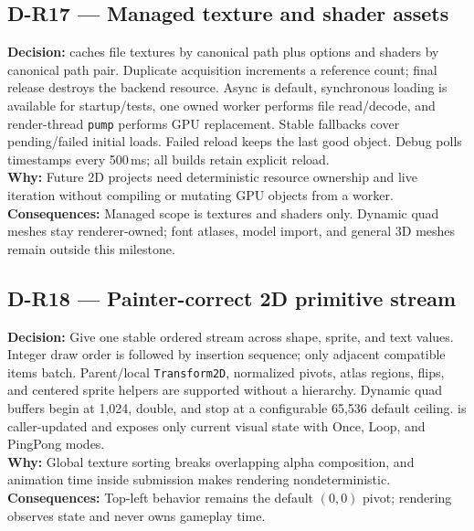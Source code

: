 \subsection*{D-R17 --- Managed texture and shader assets}
\begin{decisionbox}[title={D-R17 \quad 2026-08-09}]
\textbf{Decision:}  caches file textures by canonical
path plus options and shaders by canonical path pair. Duplicate acquisition
increments a reference count; final release destroys the backend resource.
Async is default, synchronous loading is available for startup/tests, one owned
worker performs file read/decode, and render-thread \texttt{pump} performs GPU
replacement. Stable fallbacks cover pending/failed initial loads. Failed reload
keeps the last good object. Debug polls timestamps every 500\,ms; all builds
retain explicit reload.\\
\textbf{Why:} Future 2D projects need deterministic resource ownership and live
iteration without compiling or mutating GPU objects from a worker.\\
\textbf{Consequences:} Managed scope is textures and shaders only. Dynamic quad
meshes stay renderer-owned; font atlases, model import, and general 3D meshes
remain outside this milestone.
\end{decisionbox}

\subsection*{D-R18 --- Painter-correct 2D primitive stream}
\begin{decisionbox}[title={D-R18 \quad 2026-08-09}]
\textbf{Decision:} Give  one stable ordered stream across
shape, sprite, and text values. Integer draw order is followed by insertion
sequence; only adjacent compatible items batch. Parent/local
\texttt{Transform2D}, normalized pivots, atlas regions, flips, and centered
sprite helpers are supported without a hierarchy. Dynamic quad buffers begin at
1,024, double, and stop at a configurable 65,536 default ceiling.
 is caller-updated and exposes only current visual
state with Once, Loop, and PingPong modes.\\
\textbf{Why:} Global texture sorting breaks overlapping alpha composition, and
animation time inside submission makes rendering nondeterministic.\\
\textbf{Consequences:} Top-left behavior remains the default $(0,0)$ pivot;
rendering observes state and never owns gameplay time.
\end{decisionbox}

